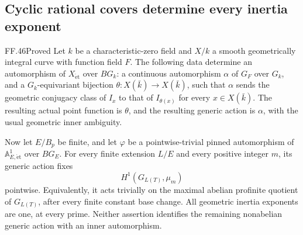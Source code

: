 \subsection{Cyclic rational covers determine every inertia exponent}

\begin{claim}{FF.46}{Proved}\label{clm:FFallprimekernel}
Let \(k\) be a characteristic-zero field and \(X/k\)
a smooth geometrically integral curve with function field
\(F\). The following data determine an automorphism of
\(X_{\mathrm{\acute et}}\) over \(BG_k\): a continuous
automorphism \(\alpha\) of \(G_F\) over \(G_k\),
and a \(G_k\)-equivariant bijection
\(\theta:X(\bar k)\to X(\bar k)\), such that
\(\alpha\) sends the geometric conjugacy class of
\(I_x\) to that of \(I_{\theta(x)}\) for every
\(x\in X(\bar k)\). The resulting actual point
function is \(\theta\), and the resulting generic
action is \(\alpha\), with the usual geometric inner
ambiguity.

Now let \(E/B_p\) be finite, and let \(\varphi\)
be a pointwise-trivial pinned automorphism of
\(\mathbb A^1_{E,\mathrm{\acute et}}\) over \(BG_E\).
For every finite extension \(L/E\) and every positive
integer \(m\), its generic action fixes
\[
                    H^1(G_{L(T)},\mu_m)
\]
pointwise. Equivalently, it acts trivially on the maximal
abelian profinite quotient of \(G_{L(T)}\), after
every finite constant base change. All geometric inertia
exponents are one, at every prime. Neither assertion
identifies the remaining nonabelian generic action with
an inner automorphism.
\end{claim}

